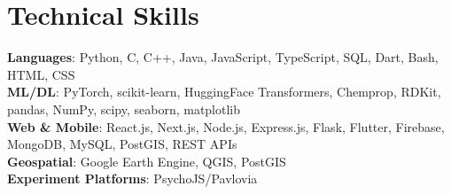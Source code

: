 \documentclass[letterpaper,11pt]{article}
\begin{document}
\section{Technical Skills}
 \begin{itemize}[leftmargin=0.15in, label={}]
    \small{\item{
     \textbf{Languages}{: Python, C, C++, Java, JavaScript, TypeScript, SQL, Dart, Bash, HTML, CSS} \\
     \textbf{ML/DL}{: PyTorch, scikit-learn, HuggingFace Transformers, Chemprop, RDKit, pandas, NumPy, scipy, seaborn, matplotlib} \\
     \textbf{Web \& Mobile}{: React.js, Next.js, Node.js, Express.js, Flask, Flutter, Firebase, MongoDB, MySQL, PostGIS, REST APIs} \\
     \textbf{Geospatial}{: Google Earth Engine, QGIS, PostGIS} \\
     \textbf{Experiment Platforms}{: PsychoJS/Pavlovia}
    }}
 \end{itemize}
\end{document}
